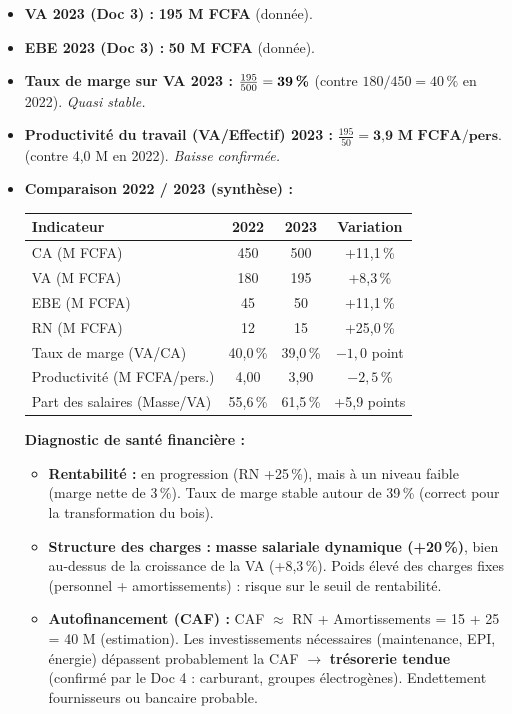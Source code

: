 \documentclass[11pt]{article}
\begin{document}
\begin{corrige}
\begin{itemize}
    \item \textbf{VA 2023 (Doc 3) :} \textbf{195 M FCFA} (donnée).
    \item \textbf{EBE 2023 (Doc 3) :} \textbf{50 M FCFA} (donnée).
    \item \textbf{Taux de marge sur VA 2023 :} $\frac{195}{500} = \textbf{39\,\%}$ (contre $180/450 = 40\,\%$ en 2022). \emph{Quasi stable.}
    \item \textbf{Productivité du travail (VA/Effectif) 2023 :} $\frac{195}{50} = \textbf{3,9 M FCFA/pers.}$ (contre 4,0 M en 2022). \emph{Baisse confirmée.}
    \item \textbf{Comparaison 2022 / 2023 (synthèse) :}
    \begin{center}
    \begin{tabular}{|l|c|c|c|}\hline
    \rowcolor{popblueL}
    \textbf{Indicateur} & \textbf{2022} & \textbf{2023} & \textbf{Variation} \\ \hline
    CA (M FCFA) & 450 & 500 & +11,1\,\% \\ \hline
    VA (M FCFA) & 180 & 195 & +8,3\,\% \\ \hline
    EBE (M FCFA) & 45 & 50 & +11,1\,\% \\ \hline
    RN (M FCFA) & 12 & 15 & +25,0\,\% \\ \hline
    Taux de marge (VA/CA) & 40,0\,\% & 39,0\,\% & $-1,0$ point \\ \hline
    Productivité (M FCFA/pers.) & 4,00 & 3,90 & $-2,5$\,\% \\ \hline
    Part des salaires (Masse/VA) & 55,6\,\% & 61,5\,\% & +5,9 points \\ \hline
    \end{tabular}
    \end{center}
    \textbf{Diagnostic de santé financière :}
    \begin{itemize}
        \item \textbf{Rentabilité :} en progression (RN +25\,\%), mais à un niveau faible (marge nette de 3\,\%). Taux de marge stable autour de 39\,\% (correct pour la transformation du bois).
        \item \textbf{Structure des charges :} \textbf{masse salariale dynamique (+20\,\%)}, bien au-dessus de la croissance de la VA (+8,3\,\%). Poids élevé des charges fixes (personnel + amortissements) : risque sur le seuil de rentabilité.
        \item \textbf{Autofinancement (CAF) :} CAF $\approx$ RN + Amortissements = 15 + 25 = 40 M (estimation). Les investissements nécessaires (maintenance, EPI, énergie) dépassent probablement la CAF $\rightarrow$ \textbf{trésorerie tendue} (confirmé par le Doc 4 : carburant, groupes électrogènes). Endettement fournisseurs ou bancaire probable.

\end{itemize}
\end{itemize}
\end{corrige}
\end{document}
